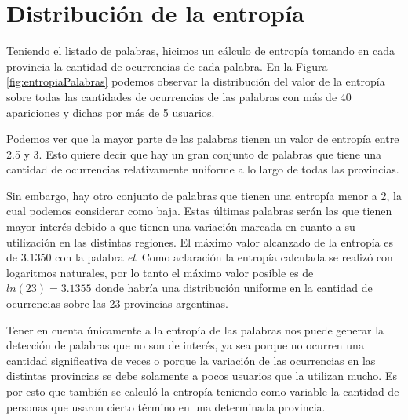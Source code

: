 







\section{Distribución de la entropía}
Teniendo el listado de palabras, hicimos un cálculo de entropía tomando en cada provincia la cantidad de ocurrencias de cada palabra. En la Figura \ref{fig:entropiaPalabras} podemos observar la distribución del valor de la entropía sobre todas las cantidades de ocurrencias de las palabras con más de 40 apariciones y dichas por más de 5 usuarios. 

Podemos ver que la mayor parte de las palabras tienen un valor de entropía entre 2.5 y 3. Esto quiere decir que hay un gran conjunto de palabras que tiene una cantidad de ocurrencias relativamente uniforme a lo largo de todas las provincias. 

Sin embargo, hay otro conjunto de palabras que tienen una entropía menor a 2, la cual podemos considerar como baja. Estas últimas palabras serán las que tienen mayor interés debido a que tienen una variación marcada en cuanto a su utilización en las distintas regiones. El máximo valor alcanzado de la entropía es de $3.1350$ con la palabra \textit{el}. Como aclaración la entropía calculada se realizó con logaritmos naturales, por lo tanto el máximo valor posible es de  $ln(23) = 3.1355$ donde habría una distribución uniforme en la cantidad de ocurrencias sobre las 23 provincias argentinas.

Tener en cuenta únicamente a la entropía de las palabras nos puede generar la detección de palabras que no son de interés, ya sea porque no ocurren una cantidad significativa de veces o porque la variación de las ocurrencias en las distintas provincias se debe solamente a pocos usuarios que la utilizan mucho. Es por esto que también se calculó la entropía teniendo como variable la cantidad de personas que usaron cierto término en una determinada provincia.


